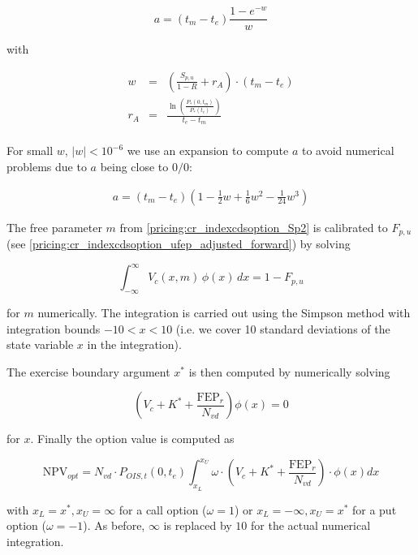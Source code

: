 \begin{equation}
a = \left(t_m-t_e\right) \frac{1 - e^{-w}}{w}
\end{equation}

with

\begin{eqnarray}
w &=& \left(\frac{S_{p,u}}{1-R} + r_A \right) \cdot (t_m-t_e) \\
r_A &=& \frac{\ln \left( \frac{P_{*}(0,t_m)}{P_{*}(t_e)} \right)}{t_e-t_m} \\
\end{eqnarray}

For small $w$, $|w| < 10^{-6}$ we use an expansion to compute $a$ to avoid numerical problems due to $a$ being close to
$0/0$:

\begin{eqnarray}
a = (t_m-t_e) \left(1 - \frac{1}{2}w+\frac{1}{6}w^2-\frac{1}{24}w^3\right)
\end{eqnarray}

The free parameter $m$ from \ref{pricing:cr_indexcdsoption_Sp2} is calibrated to $F_{p,u}$
(see \ref{pricing:cr_indexcdsoption_ufep_adjusted_forward}) by solving

\begin{equation}
\int_{-\infty}^{\infty} V_c(x,m) \, \phi(x) \, dx = 1 - F_{p,u}
\end{equation}

for $m$ numerically. The integration is carried out using the Simpson method with integration bounds $-10 < x < 10$
(i.e. we cover 10 standard deviations of the state variable $x$ in the integration). 

The exercise boundary argument $x^*$ is then computed by numerically solving

\begin{equation}
\left( V_c + K^* + \frac{\text{FEP}_r}{N_{vd}} \right) \phi(x) = 0
\end{equation}

for $x$. Finally the option value is computed as

\begin{equation}
\text{NPV}_{opt} = N_{vd} \cdot P_{OIS,t}(0,t_e) \int_{x_L}^{x_U} \omega \cdot \left(V_c + K^* + \frac{\text{FEP}_r}{N_{vd}}\right) \cdot \phi(x) dx
\end{equation}

with $x_L= x^*, x_U=\infty$ for a call option ($\omega=1$) or $x_L=-\infty, x_U=x^*$ for a put option ($\omega=-1$). As
before, $\infty$ is replaced by $10$ for the actual numerical integration.

